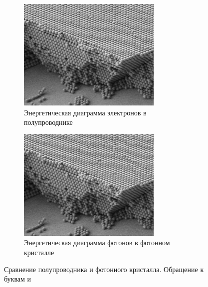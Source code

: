 \documentclass[../template.tex]{subfiles}
\begin{document}
\begin{figure}[h]
	\centering
	\begin{subfigure}[t]{.48\textwidth}
		\centering
		\includegraphics[height=.7\linewidth]{../images/sample_pic.png}  
		\caption{Энергетическая диаграмма электронов в полупроводнике}
		\label{fig:subfig_a}
	\end{subfigure}
	\hfill
	\begin{subfigure}[t]{.48\textwidth}
		\centering
		\includegraphics[height=.7\linewidth]{../images/sample_pic.png} 
		\caption{Энергетическая диаграмма фотонов в фотонном кристалле}
		\label{fig:subfig_b}
	\end{subfigure}
	\caption{Сравнение полупроводника и фотонного кристалла. Обращение к буквам  и }
	\label{fig:fig_of_subfig}
\end{figure}	
	
\end{document}
